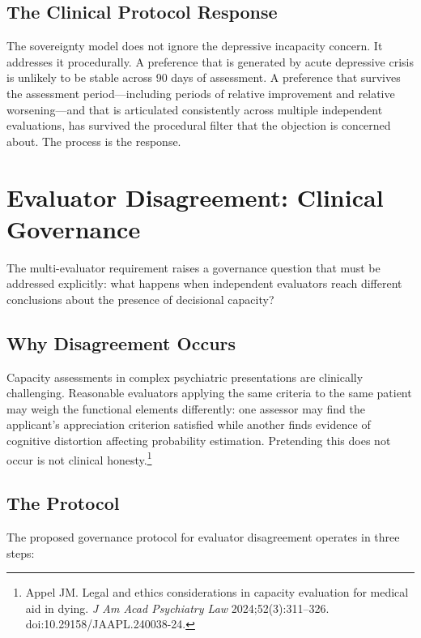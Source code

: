\documentclass[11pt, letterpaper]{article}
\begin{document}
\subsection{The Clinical Protocol Response}

The sovereignty model does not ignore the depressive incapacity concern. It addresses
it procedurally. A preference that is generated by acute depressive crisis is unlikely
to be stable across 90 days of assessment. A preference that survives the assessment
period---including periods of relative improvement and relative worsening---and
that is articulated consistently across multiple independent evaluations, has survived
the procedural filter that the objection is concerned about. The process is the
response.

\section{Evaluator Disagreement: Clinical Governance}

The multi-evaluator requirement raises a governance question that must be addressed
explicitly: what happens when independent evaluators reach different conclusions about
the presence of decisional capacity?

\subsection{Why Disagreement Occurs}

Capacity assessments in complex psychiatric presentations are clinically challenging.
Reasonable evaluators applying the same criteria to the same patient may weigh the
functional elements differently: one assessor may find the applicant's appreciation
criterion satisfied while another finds evidence of cognitive distortion affecting
probability estimation. Pretending this does not occur is not clinical
honesty.\footnote{%
  Appel JM. Legal and ethics considerations in capacity evaluation for medical aid in
  dying. \textit{J Am Acad Psychiatry Law} 2024;52(3):311--326.
  doi:10.29158/JAAPL.240038-24.}

\subsection{The Protocol}

The proposed governance protocol for evaluator disagreement operates in three steps:
\end{document}
